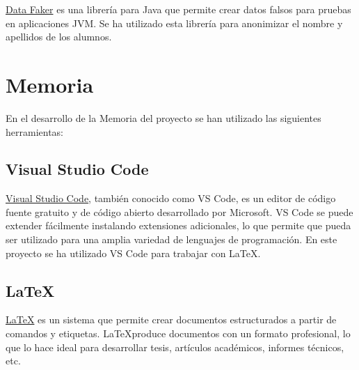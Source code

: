 \href{https://www.datafaker.net/}{Data Faker} es una librería para Java que permite crear datos falsos para pruebas en aplicaciones JVM. Se ha
 utilizado esta librería para anonimizar el nombre y apellidos de los alumnos. 


\newpage
\section{Memoria}

En el desarrollo de la Memoria del proyecto se han utilizado las siguientes herramientas: 

\subsection{Visual Studio Code}

\href{https://code.visualstudio.com/}{Visual Studio Code}, también conocido como VS Code, es un editor de código fuente gratuito y de código abierto
 desarrollado por Microsoft. VS Code se puede extender fácilmente instalando extensiones adicionales, lo que permite que pueda ser utilizado para una
  amplia variedad de lenguajes de programación. En este proyecto se ha utilizado VS Code para trabajar con \LaTeX.

\subsection{\LaTeX}

\href{https://www.latex-project.org/}{\LaTeX} es un sistema que permite crear documentos estructurados a partir de comandos y etiquetas. 
\LaTeX produce documentos con un formato profesional, lo que lo hace ideal para desarrollar tesis, artículos académicos, informes técnicos, etc.

